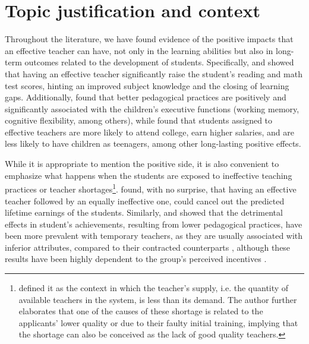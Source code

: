 \section{Topic justification and context}

Throughout the literature, we have found evidence of the positive impacts that an effective teacher can have, not only in the learning abilities but also in long-term outcomes related to the development of students. Specifically, \citet{Rockoff_2004, Rivkin_et_al_2005, Duflo_et_al_2009, Hanushek_et_al_2012, Muralidharan_et_al_2013, Chetty_et_al_2014a} and \citet{Araujo_et_al_2016} showed that having an effective teacher significantly raise the student's reading and math test scores, hinting an improved subject knowledge and the closing of learning gaps. Additionally, \citet{Araujo_et_al_2016} found that better pedagogical practices are positively and significantly associated with the children's executive functions (working memory, cognitive flexibility, among others), while \citet{Chetty_et_al_2014b} found that students assigned to effective teachers are more likely to attend college, earn higher salaries, and are less likely to have children as teenagers, among other long-lasting positive effects.

While it is appropriate to mention the positive side, it is also convenient to emphasize what happens when the students are exposed to ineffective teaching practices or teacher shortages\footnote{\citet{Bertoni_et_al_2020a} defined it as the context in which the teacher's supply, i.e. the quantity of available teachers in the system, is less than its demand. The author further elaborates that one of the causes of these shortage is related to the applicants' lower quality or due to their faulty initial training, implying that the shortage can also be conceived as the lack of good quality teachers.}. \citet{Hanushek_et_al_2012} found, with no surprise, that having an effective teacher followed by an equally ineffective one, could cancel out the predicted lifetime earnings of the students. Similarly, \citet{Ayala_2017} and \citet{Marotta_2019} showed that the detrimental effects in student's achievements, resulting from lower pedagogical practices, have been more prevalent with temporary teachers, as they are usually associated with inferior attributes, compared to their contracted counterparts \citep{Bertoni_et_al_2020a}, although these results have been highly dependent to the group's perceived incentives \citep{Duflo_et_al_2009, Muralidharan_et_al_2013, Duflo_et_al_2015}.

